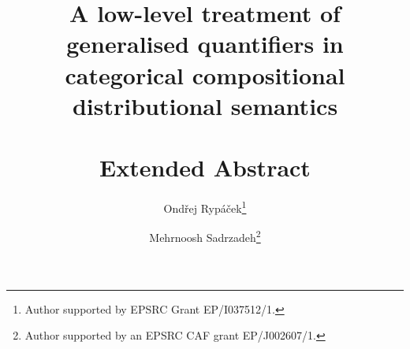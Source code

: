 \documentclass[a4paper,11pt]{easychair}
\begin{document}
\title{A low-level treatment of generalised quantifiers in categorical compositional distributional semantics\\ \ \\ Extended Abstract \\ }




%
\author{
Ond\v{r}ej Ryp\'a\v{c}ek\thanks{Author supported by EPSRC Grant EP/I037512/1.}
\and
    Mehrnoosh Sadrzadeh\thanks{Author supported by an EPSRC CAF grant EP/J002607/1.}
}




\clearpage

\maketitle

%
%
%

\end{document}
